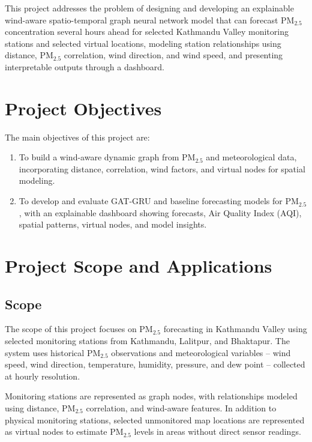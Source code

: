 This project addresses the problem of designing and developing an explainable
wind-aware spatio-temporal graph neural network model that can forecast PM$_{2.5}$
concentration several hours ahead for selected Kathmandu Valley monitoring stations and
selected virtual locations, modeling station relationships using distance, PM$_{2.5}$
correlation, wind direction, and wind speed, and presenting interpretable outputs
through a dashboard.

\section{Project Objectives}


The main objectives of this project are:

\begin{enumerate}
    \item To build a wind-aware dynamic graph from PM$_{2.5}$ and meteorological data, incorporating distance, correlation, wind factors, and virtual nodes for spatial modeling.
    \item To develop and evaluate GAT-GRU and baseline forecasting models for PM$_{2.5}$, with an explainable dashboard showing forecasts, Air Quality Index (AQI), spatial patterns, virtual nodes, and model insights.
\end{enumerate}

\section{Project Scope and Applications}


\subsection{Scope}


The scope of this project focuses on PM$_{2.5}$ forecasting in Kathmandu Valley using
selected monitoring stations from Kathmandu, Lalitpur, and Bhaktapur. The system uses
historical PM$_{2.5}$ observations and meteorological variables -- wind speed, wind direction,
temperature, humidity, pressure, and dew point -- collected at hourly resolution.

Monitoring stations are represented as graph nodes, with relationships modeled using
distance, PM$_{2.5}$ correlation, and wind-aware features. In addition to physical monitoring
stations, selected unmonitored map locations are represented as virtual nodes to estimate
PM$_{2.5}$ levels in areas without direct sensor readings.


